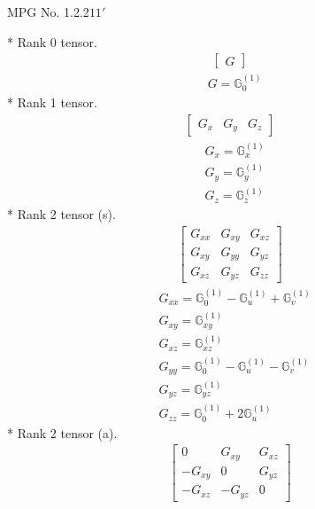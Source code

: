 \documentclass[fleqn,8pt,landscape]{jsarticle}
\begin{document}
\setcounter{MaxMatrixCols}{32}

\renewcommand{\tablename}{Table~}
\renewcommand{\figurename}{Figure~}
\begin{center}
\LARGE
MPG No. 1.2.2\quad$11'$
\end{center}
* Rank 0 tensor.
\begin{align*}
\begin{bmatrix} G \end{bmatrix}
\end{align*}
\begin{align*}
& G = \mathbb{G}_{0}^{(1)}
\end{align*}
* Rank 1 tensor.
\begin{align*}
\begin{bmatrix} G_{x} & G_{y} & G_{z} \end{bmatrix}
\end{align*}
\begin{align*}
& G_{x} = \mathbb{G}_{x}^{(1)} \\
& G_{y} = \mathbb{G}_{y}^{(1)} \\
& G_{z} = \mathbb{G}_{z}^{(1)}
\end{align*}
* Rank 2 tensor (s).
\begin{align*}
\begin{bmatrix} G_{xx} & G_{xy} & G_{xz} \\ G_{xy} & G_{yy} & G_{yz} \\ G_{xz} & G_{yz} & G_{zz} \end{bmatrix}
\end{align*}
\begin{align*}
& G_{xx} = \mathbb{G}_{0}^{(1)} - \mathbb{G}_{u}^{(1)} + \mathbb{G}_{v}^{(1)} \\
& G_{xy} = \mathbb{G}_{xy}^{(1)} \\
& G_{xz} = \mathbb{G}_{xz}^{(1)} \\
& G_{yy} = \mathbb{G}_{0}^{(1)} - \mathbb{G}_{u}^{(1)} - \mathbb{G}_{v}^{(1)} \\
& G_{yz} = \mathbb{G}_{yz}^{(1)} \\
& G_{zz} = \mathbb{G}_{0}^{(1)} + 2 \mathbb{G}_{u}^{(1)}
\end{align*}
* Rank 2 tensor (a).
\begin{align*}
\begin{bmatrix} 0 & G_{xy} & G_{xz} \\ - G_{xy} & 0 & G_{yz} \\ - G_{xz} & - G_{yz} & 0 \end{bmatrix}
\end{align*}
\end{document}
